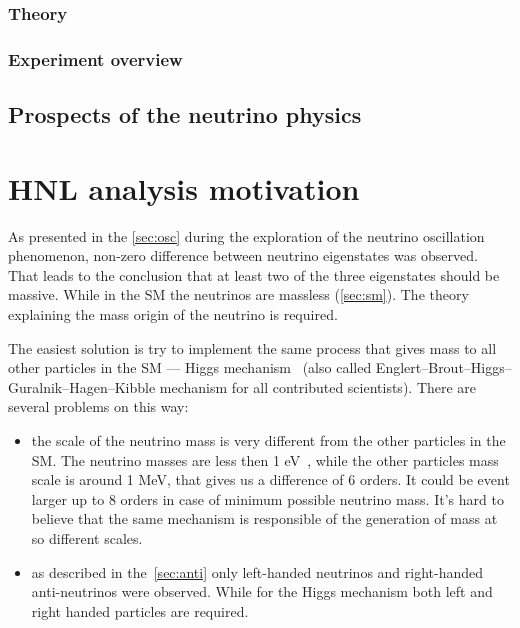 \documentclass[../main.tex]{subfiles}
\begin{document}
\subsection{Theory}

\subsection{Experiment overview}
\label{sec:exp}



\section{Prospects of the neutrino physics}





\chapter{HNL analysis motivation}
\label{ch:intro:HNL}

As presented in the \autoref{sec:osc} during the exploration of the neutrino oscillation phenomenon, non-zero difference between neutrino eigenstates was observed. That leads to the conclusion that at least two of the three eigenstates should be massive. While in the SM the neutrinos are massless (\autoref{sec:sm}). The theory explaining the mass origin of the neutrino is required.

The easiest solution is try to implement the same process that gives mass to all other particles in the SM --- Higgs mechanism~\cite{Higgs1964} (also called Englert–Brout–Higgs–Guralnik–Hagen–Kibble mechanism for all contributed scientists). There are several problems on this way:
\begin{itemize}
  \item the scale of the neutrino mass is very different from the other particles in the SM. The neutrino masses are less then 1 eV~\cite{Aker2019}, while the other particles mass scale is around 1 MeV, that gives us a difference of 6 orders. It could be event larger up to 8 orders in case of minimum possible neutrino mass. It's hard to believe that the same mechanism is responsible of the generation of mass at so different scales.
  \item as described in the~\autoref{sec:anti} only left-handed neutrinos and right-handed anti-neutrinos were observed. While for the Higgs mechanism both left and right handed particles are required.
\end{itemize}
\end{document}
